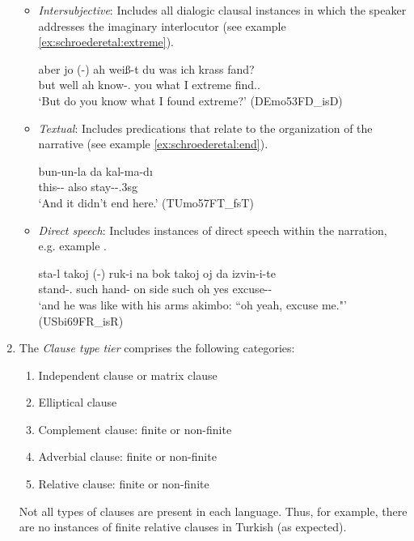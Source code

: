 \documentclass[output=paper,colorlinks,citecolor=brown]{langscibook}
\begin{document}
\begin{enumerate}[label=\Roman*.]
\begin{itemize}
\item
\textit{Intersubjective}: Includes all dialogic clausal instances in which the speaker addresses the imaginary interlocutor (see example \ref{ex:schroederetal:extreme}).

\ea
\label{ex:schroederetal:extreme}
\gll aber jo (-) ah	weiß-t du was ich krass fand?\\
but	well {} ah	know-\Prs.\Ssg{} you	what I		extreme	find.\Pst.\Fsg{}\\
\glt  `But do you know what I found extreme?' (DEmo53FD\_isD)
\z

\item
\textit{Textual}: Includes predications that relate to the organization of the narrative (see example \ref{ex:schroederetal:end}).

\ea
\label{ex:schroederetal:end}
\gll bun-un-la da kal-ma-dı\\
this-\Gen-\Inst{} also stay-\Neg-\Pst.3sg{}\\
\glt  `And it didn’t end here.' (TUmo57FT\_fsT)
\z

\item
\textit{Direct speech}: Includes instances of direct speech within the narration, e.g. example .

\ea
\label{ex:schroederetal:ruki}
\gll sta-l takoj (-) ruk-i na bok takoj oj da izvin-i-te\\
stand-\Pst.\Tsg{} such {} hand-\Pl{} on side such oh yes excuse-\IMP-\Spl{}\\
\glt `and he was like with his arms akimbo: “oh yeah, excuse me."' (USbi69FR\_isR)
\z

\end{itemize}

\item
The \textit{Clause type tier} comprises the following categories:

\begin{enumerate}
\item Independent clause or matrix clause
\item Elliptical clause
\item Complement clause: finite or non-finite
\item Adverbial clause: finite or non-finite
\item Relative clause: finite or non-finite
\end{enumerate}

Not all types of clauses are present in each language. Thus, for example, there are no instances of finite relative clauses in Turkish (as expected).


\end{enumerate}
\end{document}
